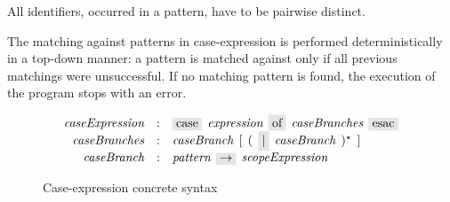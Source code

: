 All identifiers, occurred in a pattern, have to be pairwise distinct.

The matching against patterns in case-expression is performed deterministically in a top-down manner: a pattern
is matched against only if all previous matchings were unsuccessful. If no matching pattern is found, the execution
of the program stops with an error.

\begin{figure}[t]
  \[
    \begin{array}{rcl}
      \defterm{caseExpression}  & : & \term{case}\s\nonterm{expression}\s\term{of}\s\nonterm{caseBranches}\s\term{esac}\\
      \defterm{caseBranches}    & : & \nonterm{caseBranch}\s[\s(\s\term{$\mid$}\s\nonterm{caseBranch}\s)^\star\s]\\
      \defterm{caseBranch}      & : & \nonterm{pattern}\s\term{$\rightarrow$}\s\nonterm{scopeExpression}
    \end{array}
  \]
  \caption{Case-expression concrete syntax}
  \label{case_expression}
\end{figure}

%
%


